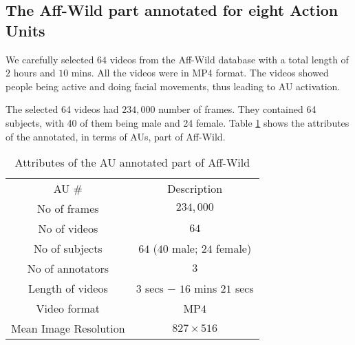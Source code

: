 \documentclass[a4paper, 10pt, conference]{ieeeconf}      %
\begin{document}
\subsection{The Aff-Wild part annotated for eight Action Units}\label{action_unit_section}

\begin{comment}
\begin{figure}
\begin{tabular}{c}
  \texttt{[image: 01\_00001.jpg]}\texttt{[image: 02\_02932.jpg]}\texttt{[image: 03\_00013.jpg]}\texttt{[image: 05\_00063.jpg]}\texttt{[image: 06\_00468.jpg]}\texttt{[image: 07\_00046.jpg]}\texttt{[image: 08\_00148.jpg]}\\
\end{tabular}
\caption{Some representatives of the new database - Part 1}
\label{fig:face_database_1}
\end{figure}
\end{comment}

We carefully selected $64$ videos from the Aff-Wild database with a total length of $2$ hours and $10$ mins. All the videos were in MP4 format. The videos showed people being active and doing facial movements, thus leading to AU activation. 

 The selected 64 videos had $234,000$ number of frames. They contained 64  subjects, with 40 of them being male and 24 female. Table \ref{attrs_au} shows the attributes of the annotated, in terms of AUs, part of Aff-Wild.  

\begin{table}[h]
\caption{Attributes of the AU annotated part of Aff-Wild}
\label{attrs_au}
\centering
\begin{tabular}{|c|c|}
\hline
AU \# & Description \\ 
\hhline{|=|=|}
No of frames  & $234,000$ \\
\hline
No of videos & $64$ \\
\hline
No of subjects  & $64$ ($40$ male; $24$ female)  \\
\hline
No of annotators  & $3$ \\
\hline
Length of videos & $3$ secs $-$ $16$ mins $21$ secs  \\
\hline
Video format & MP$4$\\
\hline
Mean Image Resolution & $827 \times 516 $\\
\hline
\end{tabular}
\end{table}
\end{document}
